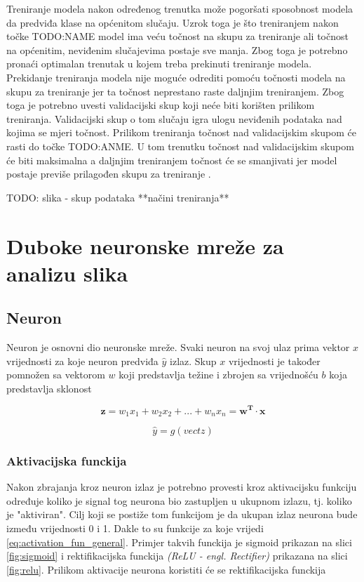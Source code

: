 \documentclass[times, utf8, zavrsni,numeric,pstricks]{fer}
\newcommand{\vect}[1]{\boldsymbol{#1}}
\begin{document}
Treniranje modela nakon određenog trenutka može pogoršati sposobnost modela da predviđa klase na općenitom slučaju. Uzrok toga je što treniranjem nakon točke TODO:NAME model ima veću točnost na skupu za treniranje ali točnost na općenitim, neviđenim slučajevima postaje sve manja. Zbog toga je potrebno pronaći optimalan trenutak u kojem treba prekinuti treniranje modela. Prekidanje treniranja modela nije moguće odrediti pomoću točnosti modela na skupu za treniranje jer ta točnost neprestano raste daljnjim treniranjem. Zbog toga je potrebno uvesti validacijski skup koji neće biti korišten prilikom treniranja. Validacijski skup o tom slučaju igra ulogu neviđenih podataka nad kojima se mjeri točnost. Prilikom treniranja točnost nad validacijskim skupom će rasti do točke TODO:ANME. U tom trenutku točnost nad validacijskim skupom će biti maksimalna a daljnjim treniranjem točnost će se smanjivati jer model postaje previše prilagođen skupu za treniranje . 

TODO: slika - skup podataka  
**načini treniranja**

\section{Duboke neuronske mreže za analizu slika}
\subsection{Neuron}
Neuron je osnovni dio neuronske mreže. Svaki neuron na svoj ulaz prima vektor $x$ vrijednosti za koje neuron predviđa $\hat{y}$ izlaz. Skup $x$ vrijednosti je također pomnožen sa vektorom $w$ koji predstavlja težine  i zbrojen sa vrijednošću $b$ koja predstavlja sklonost 


\begin{equation}\label{eq:neuron_z}
	\vect{z}=w_1x_1+w_2x_2+...+w_nx_n=\vect{w^{T}} \cdot \vect{x}
\end{equation}

\begin{equation}\label{eq:neuron_func}
	\hat{y} = g(vect{z})
\end{equation}

\subsubsection{Aktivacijska funckija}

Nakon zbrajanja kroz neuron izlaz je potrebno provesti kroz aktivacijsku funkciju određuje koliko je signal tog neurona bio zastupljen u ukupnom izlazu, tj. koliko je "aktiviran". Cilj koji se postiže tom funkcijom je da ukupan izlaz neurona bude između vrijednosti 0 i 1. Dakle to su funkcije za koje vrijedi \ref{eq:activation_fun_general}. Primjer takvih funckija je sigmoid prikazan na slici \ref{fig:sigmoid} i rektifikacijska funckija \textit{(ReLU - engl. Rectifier)} prikazana na slici \ref{fig:relu}. Prilikom aktivacije neurona koristiti će se rektifikacijska funckija
\end{document}
